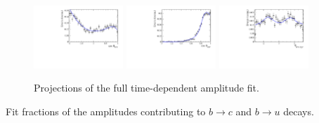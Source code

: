 \begin{figure}[h]
		\includegraphics[width=0.3\textwidth, height = !]{figs/fullFit/signal/h_cosTheta_Kpi.pdf} 
		\includegraphics[width=0.3\textwidth, height = !]{figs/fullFit/signal/h_cosTheta_Dspi.pdf} 
		\includegraphics[width=0.3\textwidth, height = !]{figs/fullFit/signal/h_phi_Kpi_Dspi.pdf} 
		

%

		\caption{Projections of the full time-dependent amplitude fit.} 		
		\label{fig:fullFit}
\end{figure}	
\begin{table}[h]
\centering
\caption{
Fit fractions of the amplitudes contributing to $b \to c$ and $b \to u$ decays.
}
	\renewcommand{\arraystretch}{1.5}
	
\label{tab:fullFractions}
\end{table}


